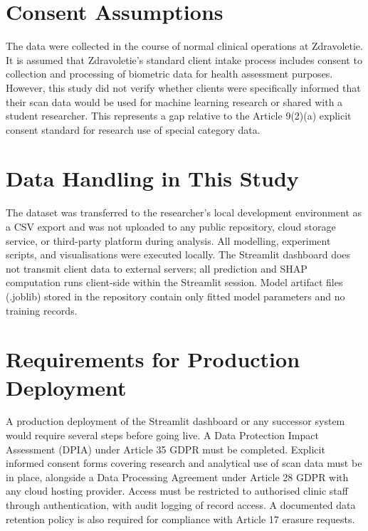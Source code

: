 \documentclass[11pt,a4paper]{report}
\begin{document}
\section{Consent Assumptions}

The data were collected in the course of normal clinical operations at Zdravoletie. It is assumed that Zdravoletie's standard client intake process includes consent to collection and processing of biometric data for health assessment purposes. However, this study did not verify whether clients were specifically informed that their scan data would be used for machine learning research or shared with a student researcher. This represents a gap relative to the Article 9(2)(a) explicit consent standard for research use of special category data.

\section{Data Handling in This Study}

The dataset was transferred to the researcher's local development environment as a CSV export and was not uploaded to any public repository, cloud storage service, or third-party platform during analysis. All modelling, experiment scripts, and visualisations were executed locally. The Streamlit dashboard does not transmit client data to external servers; all prediction and SHAP computation runs client-side within the Streamlit session. Model artifact files (.joblib) stored in the repository contain only fitted model parameters and no training records.

\section{Requirements for Production Deployment}

A production deployment of the Streamlit dashboard or any successor system would require several steps before going live. A Data Protection Impact Assessment (DPIA) under Article 35 GDPR must be completed. Explicit informed consent forms covering research and analytical use of scan data must be in place, alongside a Data Processing Agreement under Article 28 GDPR with any cloud hosting provider. Access must be restricted to authorised clinic staff through authentication, with audit logging of record access. A documented data retention policy is also required for compliance with Article 17 erasure requests.
\end{document}

